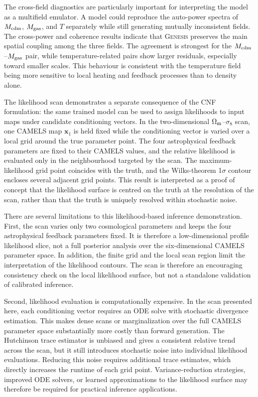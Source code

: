 \documentclass[usenatbib]{mnras}
\newcommand{\Mcdm}{M_{\rm cdm}}
\newcommand{\Mgas}{M_{\rm gas}}
\newcommand{\Tgas}{T}
\newcommand{\Om}{\Omega_{\rm m}}
\newcommand{\sig}{\sigma_8}
\begin{document}
The cross-field diagnostics are particularly important for interpreting
the model as a multifield emulator. A model could reproduce the
auto-power spectra of $\Mcdm$, $\Mgas$, and $\Tgas$ separately while
still generating mutually inconsistent fields. The cross-power and
coherence results indicate that \textsc{Genesis} preserves the main
spatial coupling among the three fields. The agreement is strongest
for the $\Mcdm$--$\Mgas$ pair, while temperature-related pairs show
larger residuals, especially toward smaller scales. This behaviour is
consistent with the temperature field being more sensitive to local
heating and feedback processes than to density alone.

The likelihood scan demonstrates a separate consequence of the CNF
formulation: the same trained model can be used to assign likelihoods
to input maps under candidate conditioning vectors. In the
two-dimensional $\Om$--$\sig$ scan, one CAMELS map $\mathbf{x}_1$ is
held fixed while the conditioning vector is varied over a local grid
around the true parameter point. The four astrophysical feedback
parameters are fixed to their CAMELS values, and the relative
likelihood is evaluated only in the neighbourhood targeted by the
scan. The maximum-likelihood grid point coincides with the truth, and
the Wilks-theorem 1$\sigma$ contour encloses several adjacent grid
points. This result is interpreted as a proof of concept that the
likelihood surface is centred on the truth at the resolution of the
scan, rather than that the truth is uniquely resolved within stochastic
noise.

There are several limitations to this likelihood-based inference
demonstration. First, the scan varies only two cosmological parameters
and keeps the four astrophysical feedback parameters fixed. It is
therefore a low-dimensional profile likelihood slice, not a full
posterior analysis over the six-dimensional CAMELS parameter space. In
addition, the finite grid and the local scan region limit the
interpretation of the likelihood contours. The scan is therefore an
encouraging consistency check on the local likelihood surface, but not
a standalone validation of calibrated inference.

Second, likelihood evaluation is computationally expensive. In the
scan presented here, each conditioning vector requires an ODE solve
with stochastic divergence estimation. This makes dense scans or
marginalization over the full CAMELS parameter space substantially more
costly than forward generation. The Hutchinson trace estimator is
unbiased and gives a consistent relative trend across the scan, but it
still introduces stochastic noise into individual likelihood
evaluations. Reducing this noise requires additional trace estimates,
which directly increases the runtime of each grid point.
Variance-reduction strategies, improved ODE solvers, or learned
approximations to the likelihood surface may therefore be required for
practical inference applications.
\end{document}
